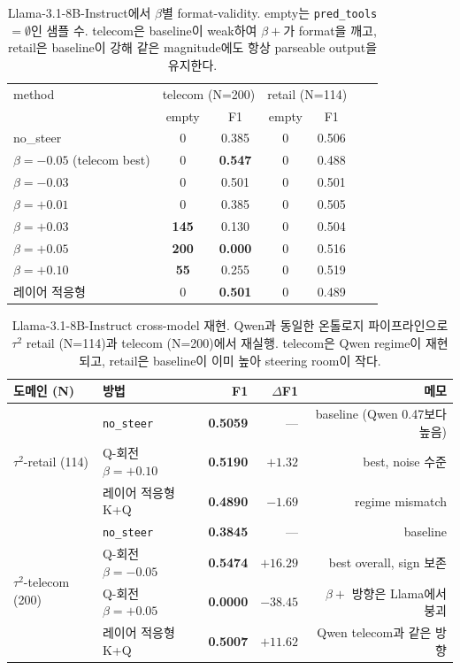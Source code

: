 \begin{table}[t]
\centering
\caption{Llama-3.1-8B-Instruct에서 $\beta$별 format-validity. empty는 \texttt{pred\_tools} $=\emptyset$인 샘플 수. telecom은 baseline이 weak하여 $\beta{+}$가 format을 깨고, retail은 baseline이 강해 같은 magnitude에도 항상 parseable output을 유지한다.}
\label{tab:format-validity}
\small
\begin{tabularx}{\linewidth}{@{}Xcccccc@{}}
\toprule
method & \multicolumn{2}{c}{telecom (N=200)} & \multicolumn{2}{c}{retail (N=114)} & & \\
 & empty & F1 & empty & F1 & & \\
\midrule
no\_steer & 0 & 0.385 & 0 & 0.506 & & \\
$\beta{=}{-}0.05$ (telecom best) & 0 & \textbf{0.547} & 0 & 0.488 & & \\
$\beta{=}{-}0.03$ & 0 & 0.501 & 0 & 0.501 & & \\
$\beta{=}{+}0.01$ & 0 & 0.385 & 0 & 0.505 & & \\
$\beta{=}{+}0.03$ & \textbf{145} & 0.130 & 0 & 0.504 & & \\
$\beta{=}{+}0.05$ & \textbf{200} & \textbf{0.000} & 0 & 0.516 & & \\
$\beta{=}{+}0.10$ & \textbf{55} & 0.255 & 0 & 0.519 & & \\
레이어 적응형 & 0 & \textbf{0.501} & 0 & 0.489 & & \\
\bottomrule
\end{tabularx}
\end{table}

\begin{table}[t]
\centering
\caption{Llama-3.1-8B-Instruct cross-model 재현. Qwen과 동일한 온톨로지 파이프라인으로 $\tau^2$ retail (N=114)과 telecom (N=200)에서 재실행. telecom은 Qwen regime이 재현되고, retail은 baseline이 이미 높아 steering room이 작다.}
\label{tab:llama-cross}
\small
\begin{tabularx}{\linewidth}{@{}lXrrr@{}}
\toprule
도메인 (N) & 방법 & F1 & $\Delta$F1 & 메모 \\
\midrule
\multirow{3}{*}{$\tau^2$-retail (114)}
 & \texttt{no\_steer} & \textbf{0.5059} & --- & baseline (Qwen 0.47보다 높음) \\
 & Q-회전 $\beta{=}{+}0.10$ & \textbf{0.5190} & $+1.32$ & best, noise 수준 \\
 & 레이어 적응형 K+Q & \textbf{0.4890} & $-1.69$ & regime mismatch \\
\midrule
\multirow{4}{*}{$\tau^2$-telecom (200)}
 & \texttt{no\_steer} & \textbf{0.3845} & --- & baseline \\
 & Q-회전 $\beta{=}{-}0.05$ & \textbf{0.5474} & $\mathbf{+16.29}$ & best overall, sign 보존 \\
 & Q-회전 $\beta{=}{+}0.05$ & \textbf{0.0000} & $-38.45$ & $\beta{+}$ 방향은 Llama에서 붕괴 \\
 & 레이어 적응형 K+Q & \textbf{0.5007} & $+11.62$ & Qwen telecom과 같은 방향 \\
\bottomrule
\end{tabularx}
\end{table}

